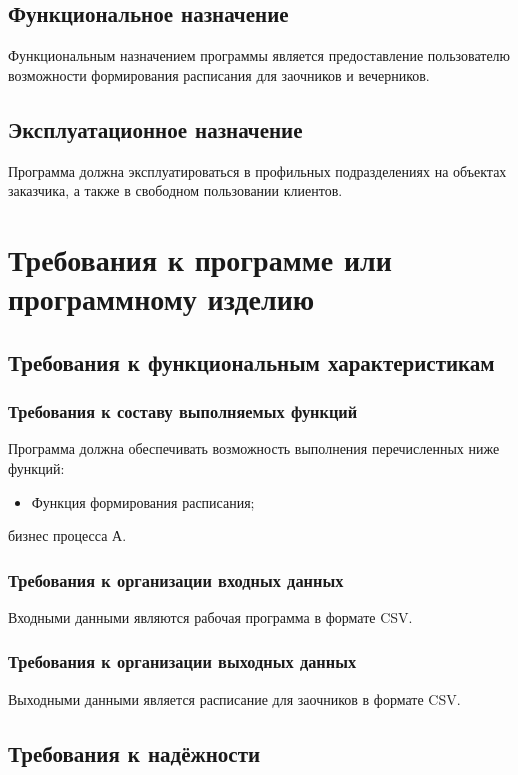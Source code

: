 \documentclass[14pt]{extarticle}
\begin{document}
\subsection{Функциональное назначение}
Функциональным назначением программы является предоставление пользователю возможности формирования расписания для заочников и вечерников.

\subsection{Эксплуатационное назначение}
Программа должна эксплуатироваться в профильных подразделениях на объектах заказчика, а также в свободном пользовании клиентов.

\newpage

\section{Требования к программе или программному изделию}
\subsection{Требования к функциональным характеристикам}
\subsubsection{Требования к составу выполняемых функций}
Программа должна обеспечивать возможность выполнения перечисленных ниже функций:\par
\begin{itemize} 
    \item Функция формирования расписания;
\end{itemize}
 бизнес процесса А.

\subsubsection{Требования к организации входных данных}
Входными данными являются рабочая программа в формате CSV.
  
\subsubsection{Требования к организации выходных данных}
Выходными данными является расписание для заочников в формате CSV.

\subsection{Требования к надёжности}  
\end{document}
